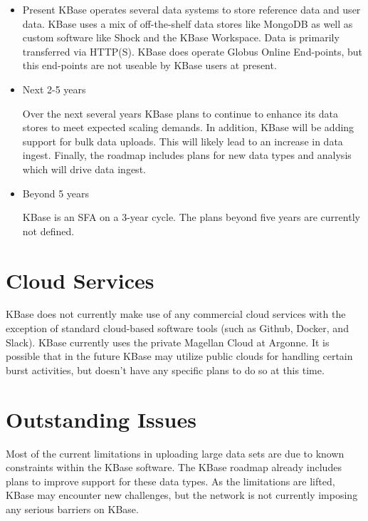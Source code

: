\documentclass[10pt,a4paper]{report}
\begin{document}
\begin{itemize}
\item Present
KBase operates several data systems to store reference data and user data.  KBase uses a mix of off-the-shelf data stores like MongoDB as well as custom software like Shock and the KBase Workspace.  Data is primarily transferred via HTTP(S). KBase does operate Globus Online End-points, but this end-points are not useable by KBase users at present.


\item Next 2-5 years

Over the next several years KBase plans to continue to enhance its data stores to meet expected scaling demands.  In addition, KBase will be adding support for bulk data uploads.  This will likely lead to an increase in data ingest.  Finally, the roadmap includes plans for new data types and analysis which will drive data ingest.

\item Beyond 5 years

KBase is an SFA on a 3-year cycle.  The plans beyond five years are currently not defined.
\end{itemize}

\section{Cloud Services}

KBase does not currently make use of any commercial cloud services with the exception of standard cloud-based software tools (such as Github, Docker, and Slack).  
KBase currently uses the private Magellan Cloud at Argonne.  It is possible that in the future KBase may utilize public clouds for handling certain burst activities, but doesn't have any specific plans to do so at this time.

\section{Outstanding Issues}

Most of the current limitations in uploading large data sets are due to known constraints within the KBase software.  
The KBase roadmap already includes plans to improve support for these data types.  
As the limitations are lifted, KBase may encounter new challenges, but the network is not currently imposing any serious barriers on KBase.
\end{document}
